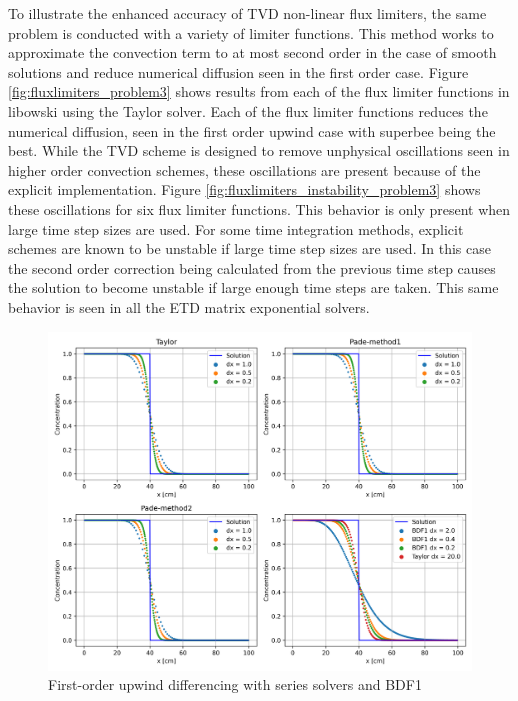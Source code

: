 To illustrate the enhanced accuracy of TVD non-linear flux limiters, the same problem is conducted with a variety of limiter functions. This method works to approximate the convection term to at most second order in the case of smooth solutions and reduce numerical diffusion seen in the first order case. Figure \ref{fig:fluxlimiters_problem3} shows results from each of the flux limiter functions in libowski using the Taylor solver. Each of the flux limiter functions reduces the numerical diffusion, seen in the first order upwind case with superbee being the best. While the TVD scheme is designed to remove unphysical oscillations seen in higher order convection schemes, these oscillations are present because of the explicit implementation. Figure \ref{fig:fluxlimiters_instability_problem3} shows these oscillations for six flux limiter functions. This behavior is only present when large time step sizes are used. For some time integration methods, explicit schemes are known to be unstable if large time step sizes are used. In this case the second order correction being calculated from the previous time step causes the solution to become unstable if large enough time steps are taken. This same behavior is seen in all the ETD matrix exponential solvers. 

\clearpage

\begin{figure}[p]
    \centering
    \includegraphics[width=6in]{images/chapter-5/problem3FirstOrder.png}
    \caption{First-order upwind differencing with series solvers and BDF1}
    \label{fig:first_order_results}
\end{figure}

